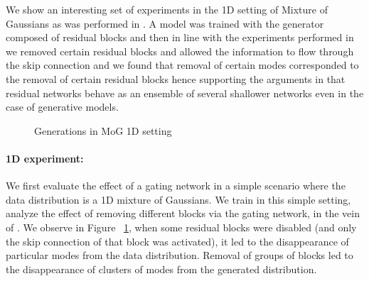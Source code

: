 We show an interesting set of experiments in the 1D setting of Mixture of Gaussians as was performed in \cite{ghosh2017multi}. A model was trained with the generator composed of residual blocks and then in line with the experiments performed in \cite{veit2016residual} we removed certain residual blocks and allowed the information to flow through the skip connection and we found that removal of certain modes corresponded to the removal of certain residual blocks hence supporting the arguments in \cite{veit2016residual} that residual networks behave as an ensemble of several shallower networks even in the case of generative models.


\begin{figure}[t]
    \centering
    \caption{Generations in MoG 1D setting}
    \label{fig:onedexperiment}
    \vspace{-3mm}
\end{figure}
\paragraph{1D experiment:}
We first evaluate the effect of a gating network in a simple scenario where the data distribution is a 1D mixture of Gaussians. 
We train \model{} in this simple setting, analyze the effect of removing different blocks via the gating network, in the vein of \cite{veit2016residual}.
We observe in Figure ~\ref{fig:onedexperiment}, when some residual blocks were disabled (and only the skip connection of that block was activated), it led to the disappearance of particular modes from the data distribution. 
Removal of groups of blocks led to the disappearance of clusters of modes from the generated distribution. 



